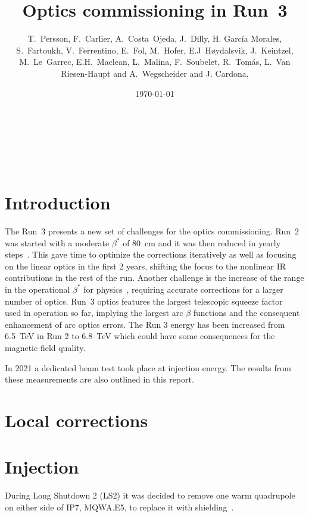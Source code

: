 \documentclass{cernatsnote}
\title{Optics commissioning in Run~3}
\author{T.~Persson,  F.~Carlier, A.~Costa~Ojeda, J.~Dilly, H. Garc\'ia Morales, S.~Fartoukh,  V.~Ferrentino, E.~Fol, M.~Hofer, E.J~Høydalsvik, J.~Keintzel, M.~Le~Garrec, E.H.~Maclean, L.~Malina,  F.~Soubelet, R.~Tom\'as, L.~Van Riesen-Haupt and A.~Wegscheider and J. Cardona, 
}
\date{\today}
\begin{document}
\maketitle

\begin{abstract}

\end{abstract}
\\ \\ \\ 

\begingroup
\color{black}
\tableofcontents
\endgroup

\pagebreak

\section{Introduction}

The Run~3 presents a new set of challenges for the optics commissioning. Run~2 was started with a moderate $\beta^*$ of 80~cm and it was then reduced in yearly steps~\cite{ACcom, ewen2019jour}. This gave time to optimize the corrections iteratively as well as focusing on the linear optics in the first 2 years, shifting the focus to the nonlinear IR contributions in the rest of the run. Another challenge is the increase of the range in the operational $\beta^*$ for physics~\cite{run3}, requiring accurate corrections for a larger number of optics. Run~3 optics features the largest telescopic squeeze factor~\cite{ats_stephane} used in operation so far, implying the largest arc $\beta$ functions and the consequent enhancement of arc optics errors.
The Run 3 energy has been increased from 6.5~TeV in Run 2 to 6.8~TeV which could have some consequences for the magnetic field quality.

In 2021 a dedicated beam test took place at injection energy. The results from these measurements are also outlined in this report. 

\section{Local corrections}
\section{Injection}

During Long Shutdown 2 (LS2) it was decided to remove one warm quadrupole on either side of IP7, MQWA.E5, to replace it with shielding~\cite{roderik}.  
\end{document}

